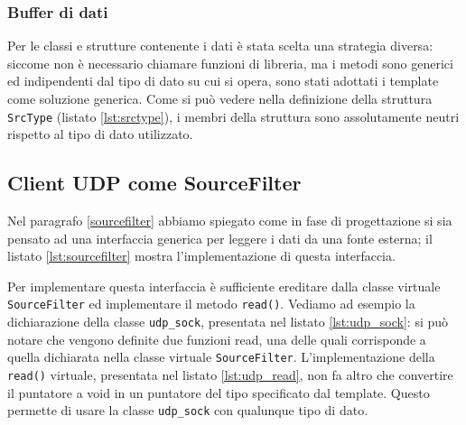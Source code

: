 

\subsubsection{Buffer di dati}
Per le classi e strutture contenente i dati \`e stata scelta una strategia
diversa: siccome non \`e necessario chiamare funzioni di libreria, ma i metodi
sono generici ed indipendenti dal tipo di dato su cui si opera, sono stati
adottati i template come soluzione generica. Come si pu\`o vedere nella
definizione della struttura \texttt{SrcType} (listato \ref{lst:srctype}), i
membri della struttura sono assolutamente neutri rispetto al tipo di dato
utilizzato.



\subsection{Client UDP come SourceFilter}
Nel paragrafo \ref{sourcefilter} abbiamo spiegato come in fase di progettazione
si sia pensato ad una interfaccia generica per leggere i dati da una fonte
esterna; il listato \ref{lst:sourcefilter} mostra l'implementazione di questa
interfaccia.


Per implementare questa interfaccia \`e sufficiente ereditare dalla classe
virtuale \texttt{SourceFilter} ed implementare il metodo \texttt{read()}.
Vediamo ad esempio la dichiarazione della classe \texttt{udp\_sock}, presentata
nel listato \ref{lst:udp_sock}: si pu\`o notare che vengono definite due
funzioni read, una delle quali corrisponde a quella dichiarata nella classe
virtuale \texttt{SourceFilter}. L'implementazione della \texttt{read()}
virtuale, presentata nel listato \ref{lst:udp_read}, non fa altro che convertire
il puntatore a void in un puntatore del tipo specificato dal template. Questo
permette di usare la classe \texttt{udp\_sock} con qualunque tipo di dato.



